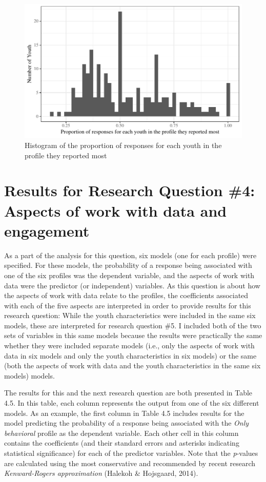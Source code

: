 \documentclass[]{msu-thesis}
\theoremstyle{definition}
\theoremstyle{definition}
\theoremstyle{definition}
\theoremstyle{remark}
\begin{document}
\begin{figure}

{\centering \includegraphics[width=0.8\linewidth]{rosenberg-dissertation_files/figure-latex/unnamed-chunk-14-1} 

}

\caption{Histogram of the proportion of responses for each youth in the profile they reported most}\label{fig:unnamed-chunk-14}
\end{figure}

\section{Results for Research Question \#4: Aspects of work with data
and
engagement}\label{results-for-research-question-4-aspects-of-work-with-data-and-engagement}

As a part of the analysis for this question, six models (one for each
profile) were specified. For these models, the probability of a response
being associated with one of the six profiles was the dependent
variable, and the aspects of work with data were the predictor (or
independent) variables. As this question is about how the aspects of
work with data relate to the profiles, the coefficients associated with
each of the five aspects are interpreted in order to provide results for
this research question: While the youth characteristics were included in
the same six models, these are interpreted for research question \#5. I
included both of the two sets of variables in this same models because
the results were practically the same whether they were included
separate models (i.e., only the aspects of work with data in six models
and only the youth characteristics in six models) or the same (both the
aspects of work with data and the youth characteristics in the same six
models) models.

The results for this and the next research question are both presented
in Table 4.5. In this table, each column represents the output from one
of the six different models. As an example, the first column in Table
4.5 includes results for the model predicting the probability of a
response being associated with the \emph{Only behavioral} profile as the
dependent variable. Each other cell in this column contains the
coefficients (and their standard errors and asterisks indicating
statistical significance) for each of the predictor variables. Note that
the \emph{p}-values are calculated using the most conservative and
recommended by recent research \emph{Kenward-Rogers approximation}
(Halekoh \& Hojsgaard, 2014).
\end{document}
